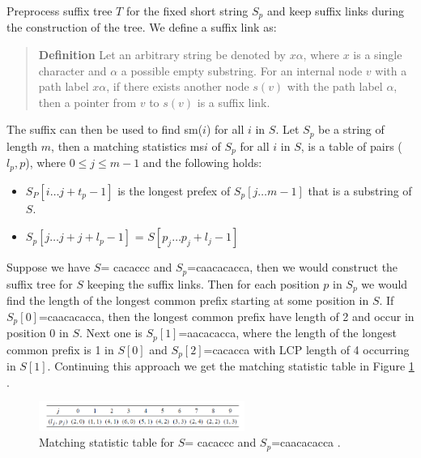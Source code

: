 \documentclass[12pt]{article} %
\begin{document}
Preprocess suffix tree $T$ for the fixed short string $S_p$ and keep suffix links during the construction of the tree. We define a suffix link as:

\begin{quote}
\textbf{Definition} 
Let an arbitrary string be denoted by $x\alpha$, where $x$ is a single character and $\alpha$ a possible empty substring. For an internal node $v$ with a path label $x\alpha$, if there exists another node $s(v)$ with the path label $\alpha$, then a pointer from $v$ to $s(v)$ is a suffix link.
\end{quote}

The suffix can then be used to find sm($i$) for all $i$ in $S$. Let $S_p$ be a string of length $m$, then a matching statistics ms$i$ of $S_p$ for all $i$ in $S$, is a table of pairs ($l_p, p$), where $0 \leq j \leq m -1$ and the following holds:
\begin{itemize}  
\item $S_P[i \ldots j + t_p-1]$ is the longest prefex of $S_p[j \ldots m -1]$ that is a substring of $S$.
\item $S_p[j \ldots j + j + l_p - 1]$ = $S[p_j \ldots p_j + l_j - 1]$
\end{itemize}

Suppose we have $S$= cacaccc and $S_p$=caacacacca, then we would construct the suffix tree for $S$ keeping the suffix links. Then for each position $p$ in $S_p$ we would find the length of the longest common prefix starting at some position in $S$. If $S_p[0]$=caacacacca, then the longest common prefix have length of 2 and  occur in position 0 in $S$. Next one is $S_p[1]$=aacacacca, where the length of the longest common prefix is 1 in $S[0]$ and $S_p[2]$=cacacca with LCP length of 4 occurring in $S[1]$. Continuing this approach we get the matching statistic table in Figure \ref{fig:matchingstatistic} \cite{enchancedsuffix}.
\begin{figure}[H]
    \centering
    \includegraphics[width=0.6\textwidth]{matchingstatistic}
    \captionsetup{width=0.8
    \textwidth}
    \caption{Matching statistic table for $S$= cacaccc and $S_p$=caacacacca \cite{enchancedsuffix}.}
    \label{fig:matchingstatistic}
\end{figure}
\end{document}
